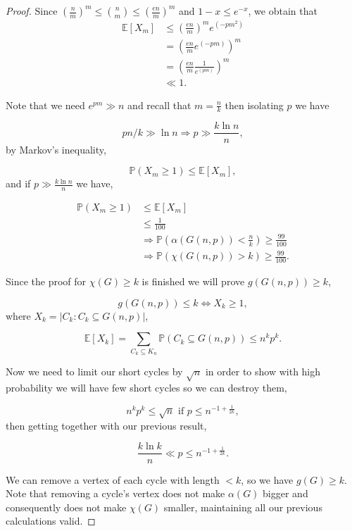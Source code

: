 \documentclass[12pt,twoside,a4paper,bibliography=totocnumbered]{book}
\numberwithin{equation}{section}
\let\log=\ln
\theoremstyle{remark}
\begin{document}
\begin{proof}
Since  $\left(\frac{n}{m}\right)^m \leq \binom{n}{m} \leq \left(\frac{en}{m}\right)^m$ and $1-x \leq e^{-x}$, we obtain that
\begin{align*}
\mathbb{E}[X_m] &\leq \left(\frac{en}{m}\right)^m  e^{(-pm^2)} \\
&= \left(\frac{en}{m} e^{(-pm)}\right)^m\\
&= \left(\frac{en}{m}\frac{1}{e^{(pm)}}\right)^m  \\
&\ll 1.
\end{align*}

Note that we need $e^{pm} \gg n$ and recall that $m =\frac{n}{k}$ then isolating $p$ we have

$$ pn/k \gg \log n \Rightarrow p \gg \frac{k\log n}{n},$$
by Markov's inequality,
 
 $$ \mathbb{P}(X_m \geq 1) \leq \mathbb{E}[X_m] ,$$
and if $p \gg \frac{k \log n}{n}$ we have,
 
 \begin{align*}
\mathbb{P}(X_m \geq 1) &\leq \mathbb{E}[X_m] \\
&\leq \frac{1}{100}  \\
&\Rightarrow \mathbb{P}\left(\alpha (G(n,p)) < \frac{n}{k}\right) \geq \frac{99}{100}\\ 
&\Rightarrow  \mathbb{P}\left(\chi(G(n,p)) > k \right) \geq \frac{99}{100}.
\end{align*}

Since the proof for $\chi(G) \geq k$ is finished we will prove $g(G(n,p))\geq k$,

$$ g(G(n,p)) \leq k \iff X_k \geq 1,$$
where $X_k = |C_k \colon C_k \subseteq G(n,p)|$,

$$\mathbb{E}[X_k] = \sum_{C_k \subseteq K_n} \mathbb{P}(C_k \subseteq G(n,p) ) \leq n^kp^k.$$

Now we need to limit our short cycles by $\sqrt{n}$ in order to show with high probability we will have few short cycles so we can destroy them,

$$n^kp^k \leq \sqrt{n} \text{ if } p \leq n^{-1 + \frac{1}{2k}},$$
then getting together with our previous result,

$$\frac{k\log k}{n} \ll p \leq n^{-1 + \frac{1}{2k}}.$$

We can remove a vertex of each cycle with length $<k$, so we have $g(G) \geq k$. Note that removing a cycle's vertex does not make $\alpha(G)$ bigger and consequently does not make $\chi(G)$ smaller, maintaining all our previous calculations valid.
\end{proof}
\end{document}

